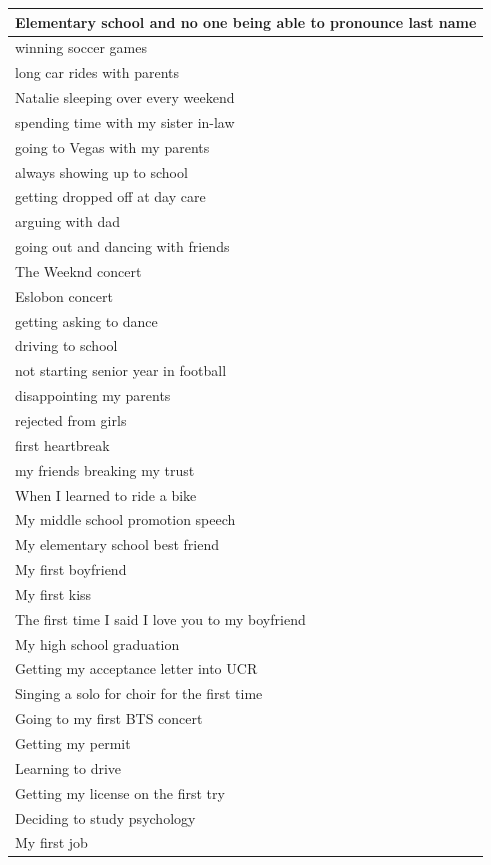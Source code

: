 \documentclass[
  .7em,
  letterpaper,
  DIV=11,
  numbers=noendperiod]{scrartcl}
\begin{document}
\begin{table}
\begin{tabular}{l}
\hline
Elementary school and no one being able to pronounce last name\\
\hline
winning soccer games\\
\hline
long car rides with parents\\
\hline
Natalie sleeping over every weekend\\
\hline
spending time with my sister in-law\\
\hline
going to Vegas with my parents\\
\hline
always showing up to school\\
\hline
getting dropped off at day care\\
\hline
arguing with dad\\
\hline
going out and dancing with friends\\
\hline
The Weeknd concert\\
\hline
Eslobon concert\\
\hline
getting asking to dance\\
\hline
driving to school\\
\hline
not starting senior year in football\\
\hline
disappointing my parents\\
\hline
rejected from girls\\
\hline
first heartbreak\\
\hline
my friends breaking my trust\\
\hline
When I learned to ride a bike\\
\hline
My middle school promotion speech\\
\hline
My elementary school best friend\\
\hline
My first boyfriend\\
\hline
My first kiss\\
\hline
The first time I said I love you to my boyfriend\\
\hline
My high school graduation\\
\hline
Getting my acceptance letter into UCR\\
\hline
Singing a solo for choir for the first time\\
\hline
Going to my first BTS concert\\
\hline
Getting my permit\\
\hline
Learning to drive\\
\hline
Getting my license on the first try\\
\hline
Deciding to study psychology\\
\hline
My first job\\

\end{tabular}
\end{table}
\end{document}
